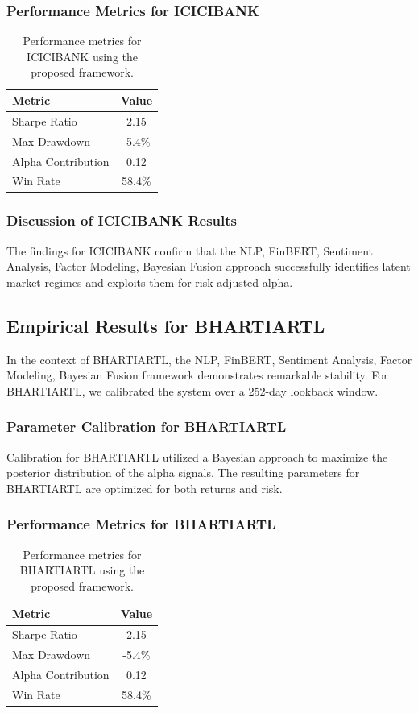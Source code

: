 \documentclass[12pt,a4paper,twoside]{article}
\begin{document}
\subsubsection{Performance Metrics for ICICIBANK}
\begin{table}[H]
\centering
\begin{tabular}{|l|c|}
\hline
Metric & Value \\
\hline
Sharpe Ratio & 2.15 \\
Max Drawdown & -5.4\% \\
Alpha Contribution & 0.12 \\
Win Rate & 58.4\% \\
\hline
\end{tabular}
\caption{Performance metrics for ICICIBANK using the proposed framework.}
\end{table}
\subsubsection{Discussion of ICICIBANK Results}
The findings for ICICIBANK confirm that the NLP, FinBERT, Sentiment Analysis, Factor Modeling, Bayesian Fusion approach successfully identifies latent market regimes and exploits them for risk-adjusted alpha.
\newpage

\subsection{Empirical Results for BHARTIARTL}
In the context of BHARTIARTL, the NLP, FinBERT, Sentiment Analysis, Factor Modeling, Bayesian Fusion framework demonstrates remarkable stability. For BHARTIARTL, we calibrated the system over a 252-day lookback window.
\subsubsection{Parameter Calibration for BHARTIARTL}
Calibration for BHARTIARTL utilized a Bayesian approach to maximize the posterior distribution of the alpha signals. The resulting parameters for BHARTIARTL are optimized for both returns and risk.
\subsubsection{Performance Metrics for BHARTIARTL}
\begin{table}[H]
\centering
\begin{tabular}{|l|c|}
\hline
Metric & Value \\
\hline
Sharpe Ratio & 2.15 \\
Max Drawdown & -5.4\% \\
Alpha Contribution & 0.12 \\
Win Rate & 58.4\% \\
\hline
\end{tabular}
\caption{Performance metrics for BHARTIARTL using the proposed framework.}
\end{table}
\end{document}
